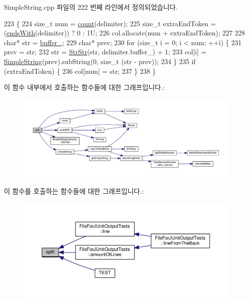 Simple\+String.\+cpp 파일의 222 번째 라인에서 정의되었습니다.


\begin{DoxyCode}
223 \{
224     \textcolor{keywordtype}{size\_t} num = \hyperlink{class_simple_string_a7b73be1ce4ddc3653ee1bc14ff1ccf3b}{count}(delimiter);
225     \textcolor{keywordtype}{size\_t} extraEndToken = (\hyperlink{class_simple_string_a96b82881ce1d49cee9ee0585bdf45ffb}{endsWith}(delimiter)) ? 0 : 1U;
226     col.allocate(num + extraEndToken);
227 
228     \textcolor{keywordtype}{char}* str = \hyperlink{class_simple_string_a37525d5cfe40669bc9ca14b3234c70d2}{buffer\_};
229     \textcolor{keywordtype}{char}* prev;
230     \textcolor{keywordflow}{for} (\textcolor{keywordtype}{size\_t} i = 0; i < num; ++i) \{
231         prev = str;
232         str = \hyperlink{class_simple_string_aa4de2381337817616753c064899f257d}{StrStr}(str, delimiter.buffer\_) + 1;
233         col[i] = \hyperlink{class_simple_string_a9fa666fba36cf703959cd0e92474b44b}{SimpleString}(prev).subString(0, \textcolor{keywordtype}{size\_t} (str - prev));
234     \}
235     \textcolor{keywordflow}{if} (extraEndToken) \{
236         col[num] = str;
237     \}
238 \}
\end{DoxyCode}


이 함수 내부에서 호출하는 함수들에 대한 그래프입니다.\+:
\nopagebreak
\begin{figure}[H]
\begin{center}
\leavevmode
\includegraphics[width=350pt]{class_simple_string_afefc06c420c72dacd7a4a0c82cd8b3ac_cgraph}
\end{center}
\end{figure}




이 함수를 호출하는 함수들에 대한 그래프입니다.\+:
\nopagebreak
\begin{figure}[H]
\begin{center}
\leavevmode
\includegraphics[width=350pt]{class_simple_string_afefc06c420c72dacd7a4a0c82cd8b3ac_icgraph}
\end{center}
\end{figure}


